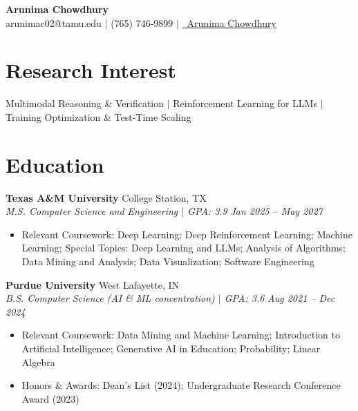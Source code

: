 \documentclass[10pt,letterpaper]{article}
\newcommand{\heading}[4]{%
  \noindent\textbf{#1} \hfill #2\\
  \textit{#3} \hfill \textit{#4}\par
}
\begin{document}

\begin{center}
  {\Large \textbf{Arunima Chowdhury}}\\[2pt]
  arunimac02@tamu.edu $|$ (765) 746-9899 $|$
  \href{https://linkedin.com/in/arunima-chowdhury}{\faLinkedin\ Arunima Chowdhury}
\end{center}
\vspace{-8pt}


\section{Research Interest}
Multimodal Reasoning \& Verification $|$ Reinforcement Learning for LLMs $|$ Training Optimization \& Test-Time Scaling

\section{Education}

\heading{Texas A\&M University}{College Station, TX}{M.S. Computer Science and Engineering $|$ GPA: 3.9}{Jan 2025 -- May 2027}
\begin{itemize}
  \item Relevant Coursework: Deep Learning; Deep Reinforcement Learning; Machine Learning; Special Topics: Deep Learning and LLMs; Analysis of Algorithms; Data Mining and Analysis; Data Visualization; Software Engineering
\end{itemize}

\heading{Purdue University}{West Lafayette, IN}{B.S. Computer Science (AI \& ML concentration) $|$ GPA: 3.6}{Aug 2021 -- Dec 2024}
\begin{itemize}
  \item Relevant Coursework: Data Mining and Machine Learning; Introduction to Artificial Intelligence; Generative AI in Education; Probability; Linear Algebra
  \item Honors \& Awards: Dean's List (2024); Undergraduate Research Conference Award (2023)
\end{itemize}
\end{document}
